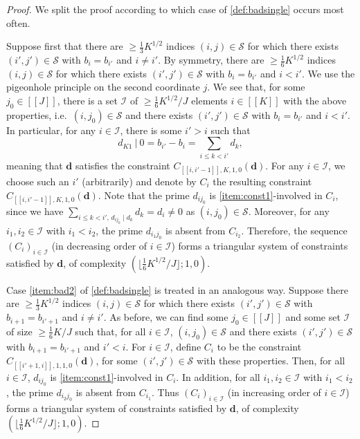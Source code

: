 \documentclass[11pt]{amsart}
\theoremstyle{definition}
\renewcommand{\leq}{\leqslant}
\renewcommand{\geq}{\geqslant}
\newcommand{\interval}[2]{[\![#1,#2]\!] }
\newcommand{\sinterval}[1]{[\![#1]\!] }
\renewcommand{\d}{\boldsymbol{d}}
\newcommand{\pcomp}[2]{d_{#1#2}}
\newcommand{\sommespart}{b}
\newcommand{\bmid}{\  \Big\vert}
\newcommand{\s}{\mathcal{S}}
\newcommand{\indexset}{\mathcal{I}}
\newcommand{\repR}{J}
\newcommand{\repK}{K}
\newcommand{\newK}{\sinterval{K}}
\newcommand{\newR}{\sinterval{J}}
\begin{document}
\begin{proof}
We split the proof according to which case of \cref{def:badsingle} occurs most often.

Suppose first that there are $\geq \tfrac13\repK^{1/2}$ indices $(i, j)\in \s$ for which there exists $(i',j')\in \s$ with $\sommespart_i = \sommespart_{i'}$ and $i\neq i'$. By symmetry, there are $\geq \tfrac{1}{6}\repK^{1/2}$ indices $(i, j)\in \s$ for which there exists $(i',j')\in \s$ with $\sommespart_i = \sommespart_{i'}$ and $i< i'$. We use the pigeonhole principle on the second coordinate $j$. We see that, for some $j_0\in \newR$, there is a set $\indexset$ of $\geq \tfrac16 \repK^{1/2}/\repR$ elements $i\in \newK$ with the above properties, i.e.~$(i,j_0)\in \s$ and there exists $(i',j')\in \s$ with $\sommespart_i = \sommespart_{i'}$ and $i<i'$. In particular, for any $i\in \indexset$, there is some $i'>i$ such that
\begin{equation*}
	\pcomp{\repK}{1} \bmid\  0 = \sommespart_{i'} - \sommespart_i = \sum_{i\leq k<i'} d_k,
\end{equation*}
meaning that $\d$ satisfies the constraint $C_{\interval{i}{i'-1},\repK,1,0}(\d)$. For any $i\in \indexset$, we choose such an $i'$ (arbitrarily) and denote by $C_i$ the resulting constraint $C_{\interval{i}{i'-1},\repK,1,0}(\d)$. Note that the prime $\pcomp{i}{j_0}$ is {\cref{item:const1}-involved} in $C_i$, since we have ${\sum_{i\leq k<i',\,\pcomp{i}{j_0}\mid d_k}d_k = d_i \neq 0}$ as $(i,j_0)\in \s$. Moreover, for any $i_1,i_2\in \indexset$ with $i_1<i_2$, the prime $\pcomp{i_1}{j_0}$ is absent from $C_{i_2}$. Therefore, the sequence $(C_i)_{i\in \indexset}$ (in decreasing order of $i\in \indexset$) forms a triangular system of constraints satisfied by $\d$, of complexity $(\lfloor \tfrac16 \repK^{1/2}/\repR\rfloor; 1, 0)$.

Case \cref{item:bad2} of \cref{def:badsingle} is treated in an analogous way. Suppose there are $\geq \tfrac13\repK^{1/2}$ indices $(i, j)\in \s$ for which there exists $(i',j')\in \s$ with $\sommespart_{i+1} = \sommespart_{i'+1}$ and $i\neq i'$. As before, we can find some $j_0\in \newR$ and some set $\indexset$ of size $\geq \tfrac16 \repK/\repR$ such that, for all $i\in \indexset$, $(i,j_0)\in \s$ and there exists $(i',j')\in \s$ with $\sommespart_{i+1} = \sommespart_{i'+1}$ and $i' < i$. For $i\in \indexset$, define $C_i$ to be the constraint $C_{\interval{i'+1}{i},1,1,0}(\d)$, for some $(i',j')\in \s$ with these properties. Then, for all $i\in \indexset$, $\pcomp{i}{j_0}$ is \cref{item:const1}-involved in $C_{i}$. In addition, for all $i_1,i_2\in \indexset$ with $i_1<i_2$, the prime $\pcomp{i_2}{j_0}$ is absent from $C_{i_1}$. Thus $(C_i)_{i\in \indexset}$ (in increasing order of $i\in \indexset$) forms a triangular system of constraints satisfied by $\d$, of complexity $(\lfloor \tfrac16 \repK^{1/2}/\repR\rfloor; 1, 0)$.


\end{proof}
\end{document}
